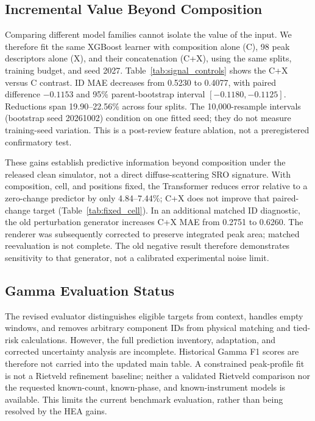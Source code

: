 \documentclass[sigconf,review,anonymous]{acmart}
\newenvironment{revision}{\ifdefined\markedcopy\color{red!70!black}\else\color{black}\fi}{}
\begin{document}
\begin{revision}
\subsection{Incremental Value Beyond Composition}
Comparing different model families cannot isolate the value of the input.
We therefore fit the same XGBoost learner with composition alone (C),
98 peak descriptors alone (X), and their concatenation (C+X), using the
same splits, training budget, and seed 2027. Table~\ref{tab:signal_controls}
shows the C+X versus C contrast. ID MAE decreases from 0.5230 to 0.4077,
with paired difference $-0.1153$ and 95\% parent-bootstrap interval
$[-0.1180,-0.1125]$. Reductions span 19.90--22.56\% across four splits.
The 10,000-resample intervals (bootstrap seed 20261002) condition on one
fitted seed; they do not measure training-seed variation. This is a
post-review feature ablation, not a preregistered confirmatory test.

\begin{table}[t]
  \centering
  \caption{Same-learner feature ablation on corrected clean targets:
  composition (C), peak descriptors (X), and both (C+X).
  $\Delta=\mathrm{MAE}_{C+X}-\mathrm{MAE}_{C}$; negative favors adding
  spectral descriptors. Intervals are paired, pointwise, parent-level
  percentile intervals conditional on the fitted models.}
  \label{tab:signal_controls}
  
\end{table}

These gains establish predictive information beyond composition under the
released clean simulator, not a direct diffuse-scattering SRO signature.
With composition, cell, and positions fixed, the Transformer reduces
error relative to a zero-change predictor by only 4.84--7.44\%; C+X
does not improve that paired-change target (Table~\ref{tab:fixed_cell}).
In an additional matched ID diagnostic, the old perturbation generator
increases C+X MAE from 0.2751 to 0.6260. The renderer was subsequently
corrected to preserve integrated peak area; matched reevaluation is not
complete. The old negative result therefore demonstrates sensitivity to
that generator, not a calibrated experimental noise limit.

\subsection{Gamma Evaluation Status}
The revised evaluator distinguishes eligible targets from context, handles
empty windows, and removes arbitrary component IDs from physical matching
and tied-risk calculations. However, the full prediction inventory,
adaptation, and corrected uncertainty analysis are incomplete. Historical
Gamma F1 scores are therefore not carried into the updated main table.
A constrained peak-profile fit is not a Rietveld refinement baseline;
neither a validated Rietveld comparison nor the requested known-count,
known-phase, and known-instrument models is available. This limits the
current benchmark evaluation, rather than being resolved by the HEA gains.
\end{revision}
\end{document}
